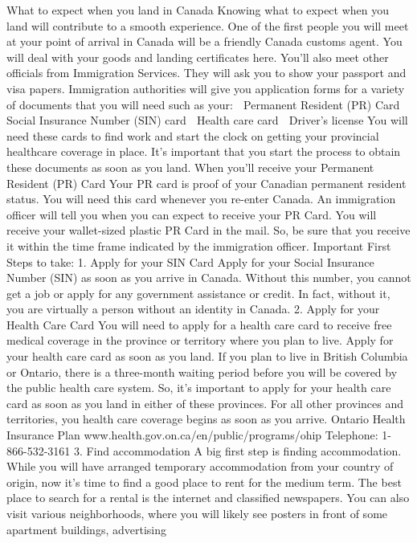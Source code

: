 \documentclass[
]{article}
\begin{document}
What to expect when you land in Canada Knowing what to expect when you
land will contribute to a smooth experience. One of the first people you
will meet at your point of arrival in Canada will be a friendly Canada
customs agent. You will deal with your goods and landing certificates
here. You'll also meet other officials from Immigration Services. They
will ask you to show your passport and visa papers. Immigration
authorities will give you application forms for a variety of documents
that you will need such as your:  Permanent Resident (PR) Card  Social
Insurance Number (SIN) card  Health care card  Driver's license You
will need these cards to find work and start the clock on getting your
provincial healthcare coverage in place. It's important that you start
the process to obtain these documents as soon as you land. When you'll
receive your Permanent Resident (PR) Card Your PR card is proof of your
Canadian permanent resident status. You will need this card whenever you
re-enter Canada. An immigration officer will tell you when you can
expect to receive your PR Card. You will receive your wallet-sized
plastic PR Card in the mail. So, be sure that you receive it within the
time frame indicated by the immigration officer. Important First Steps
to take: 1. Apply for your SIN Card Apply for your Social Insurance
Number (SIN) as soon as you arrive in Canada. Without this number, you
cannot get a job or apply for any government assistance or credit. In
fact, without it, you are virtually a person without an identity in
Canada. 2. Apply for your Health Care Card You will need to apply for a
health care card to receive free medical coverage in the province or
territory where you plan to live. Apply for your health care card as
soon as you land. If you plan to live in British Columbia or Ontario,
there is a three-month waiting period before you will be covered by the
public health care system. So, it's important to apply for your health
care card as soon as you land in either of these provinces. For all
other provinces and territories, you health care coverage begins as soon
as you arrive. Ontario Health Insurance Plan
www.health.gov.on.ca/en/public/programs/ohip Telephone: 1-866-532-3161
3. Find accommodation A big first step is finding accommodation. While
you will have arranged temporary accommodation from your country of
origin, now it's time to find a good place to rent for the medium term.
The best place to search for a rental is the internet and classified
newspapers. You can also visit various neighborhoods, where you will
likely see posters in front of some apartment buildings, advertising
\end{document}

